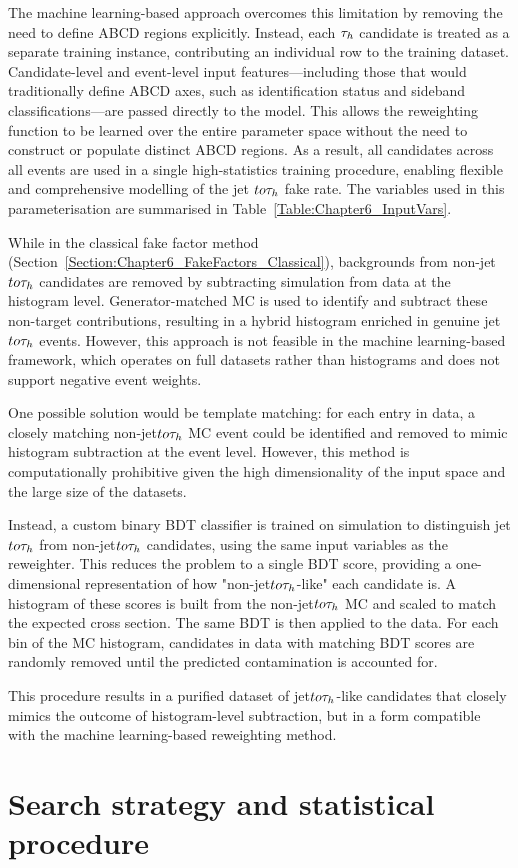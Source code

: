 The machine learning-based approach overcomes this limitation by removing the need to define ABCD regions explicitly. Instead, each $\tau_h$ candidate is treated as a separate training instance, contributing an individual row to the training dataset. Candidate-level and event-level input features—including those that would traditionally define ABCD axes, such as identification status and sideband classifications—are passed directly to the model. This allows the reweighting function to be learned over the entire parameter space without the need to construct or populate distinct ABCD regions. As a result, all candidates across all events are used in a single high-statistics training procedure, enabling flexible and comprehensive modelling of the jet $to \tau_h$ fake rate. The variables used in this parameterisation are summarised in Table~\ref{Table:Chapter6_InputVars}.

While in the classical fake factor method (Section~\ref{Section:Chapter6_FakeFactors_Classical}), backgrounds from non-jet$to\tau_h$ candidates are removed by subtracting simulation from data at the histogram level. Generator-matched MC is used to identify and subtract these non-target contributions, resulting in a hybrid histogram enriched in genuine jet$to\tau_h$ events. However, this approach is not feasible in the machine learning-based framework, which operates on full datasets rather than histograms and does not support negative event weights.

One possible solution would be template matching: for each entry in data, a closely matching non-jet$to\tau_h$ MC event could be identified and removed to mimic histogram subtraction at the event level. However, this method is computationally prohibitive given the high dimensionality of the input space and the large size of the datasets.

Instead, a custom binary BDT classifier is trained on simulation to distinguish jet$to\tau_h$ from non-jet$to\tau_h$ candidates, using the same input variables as the reweighter. This reduces the problem to a single BDT score, providing a one-dimensional representation of how "non-jet$to\tau_h$-like" each candidate is. A histogram of these scores is built from the non-jet$to\tau_h$ MC and scaled to match the expected cross section. The same BDT is then applied to the data. For each bin of the MC histogram, candidates in data with matching BDT scores are randomly removed until the predicted contamination is accounted for.

This procedure results in a purified dataset of jet$to\tau_h$-like candidates that closely mimics the outcome of histogram-level subtraction, but in a form compatible with the machine learning-based reweighting method.

\section{Search strategy and statistical procedure}







